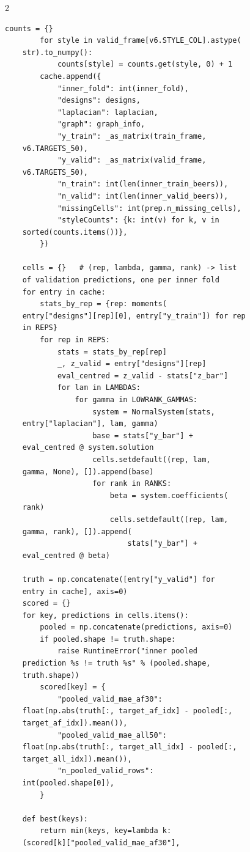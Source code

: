 \begin{multicols}{2}
\begin{Verbatim}[fontsize=\scriptsize]
        counts = {}
        for style in valid_frame[v6.STYLE_COL].astype(
    str).to_numpy():
            counts[style] = counts.get(style, 0) + 1
        cache.append({
            "inner_fold": int(inner_fold),
            "designs": designs,
            "laplacian": laplacian,
            "graph": graph_info,
            "y_train": _as_matrix(train_frame,
    v6.TARGETS_50),
            "y_valid": _as_matrix(valid_frame,
    v6.TARGETS_50),
            "n_train": int(len(inner_train_beers)),
            "n_valid": int(len(inner_valid_beers)),
            "missingCells": int(prep.n_missing_cells),
            "styleCounts": {k: int(v) for k, v in
    sorted(counts.items())},
        })

    cells = {}   # (rep, lambda, gamma, rank) -> list
    of validation predictions, one per inner fold
    for entry in cache:
        stats_by_rep = {rep: moments(
    entry["designs"][rep][0], entry["y_train"]) for rep
    in REPS}
        for rep in REPS:
            stats = stats_by_rep[rep]
            _, z_valid = entry["designs"][rep]
            eval_centred = z_valid - stats["z_bar"]
            for lam in LAMBDAS:
                for gamma in LOWRANK_GAMMAS:
                    system = NormalSystem(stats,
    entry["laplacian"], lam, gamma)
                    base = stats["y_bar"] +
    eval_centred @ system.solution
                    cells.setdefault((rep, lam,
    gamma, None), []).append(base)
                    for rank in RANKS:
                        beta = system.coefficients(
    rank)
                        cells.setdefault((rep, lam,
    gamma, rank), []).append(
                            stats["y_bar"] +
    eval_centred @ beta)

    truth = np.concatenate([entry["y_valid"] for
    entry in cache], axis=0)
    scored = {}
    for key, predictions in cells.items():
        pooled = np.concatenate(predictions, axis=0)
        if pooled.shape != truth.shape:
            raise RuntimeError("inner pooled
    prediction %s != truth %s" % (pooled.shape,
    truth.shape))
        scored[key] = {
            "pooled_valid_mae_af30":
    float(np.abs(truth[:, target_af_idx] - pooled[:,
    target_af_idx]).mean()),
            "pooled_valid_mae_all50":
    float(np.abs(truth[:, target_all_idx] - pooled[:,
    target_all_idx]).mean()),
            "n_pooled_valid_rows":
    int(pooled.shape[0]),
        }

    def best(keys):
        return min(keys, key=lambda k:
    (scored[k]["pooled_valid_mae_af30"],


\end{Verbatim}
\end{multicols}
